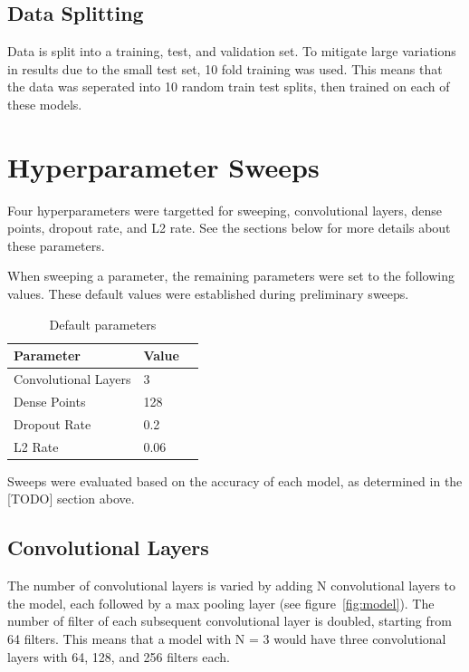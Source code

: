 \documentclass{article}
\begin{document}
\subsection{Data Splitting}

Data is split into a training, test, and validation set. To mitigate large variations in results due to the small test set, 10 fold training was used. This means that the data was seperated into 10 random train test splits, then trained on each of these models. 





\section{Hyperparameter Sweeps}

Four hyperparameters were targetted for sweeping, convolutional layers, dense points, dropout rate, and L2 rate. See the sections below for more details about these parameters.

When sweeping a parameter, the remaining parameters were set to the following values. These default values were established during preliminary sweeps.

\begin{table}[H]
    \caption{Default parameters}
    \label{parameters}
    \centering
    \begin{tabular}{lll}
      \toprule
      Parameter     & Value  \\
      \midrule
      Convolutional Layers & 3     \\
      Dense Points     & 128     \\
      Dropout Rate     & 0.2  \\
      L2 Rate     & 0.06  \\
      \bottomrule
    \end{tabular}
  \end{table}

Sweeps were evaluated based on the accuracy of each model, as determined in the [TODO] section above. 

\subsection{Convolutional Layers}

The number of convolutional layers is varied by adding N convolutional layers to the model, each followed by a max pooling layer (see figure~\ref{fig:model}). The number of filter of each subsequent convolutional layer is doubled, starting from 64 filters. This means that a model with N = 3 would have three convolutional layers with 64, 128, and 256 filters each.
\end{document}
